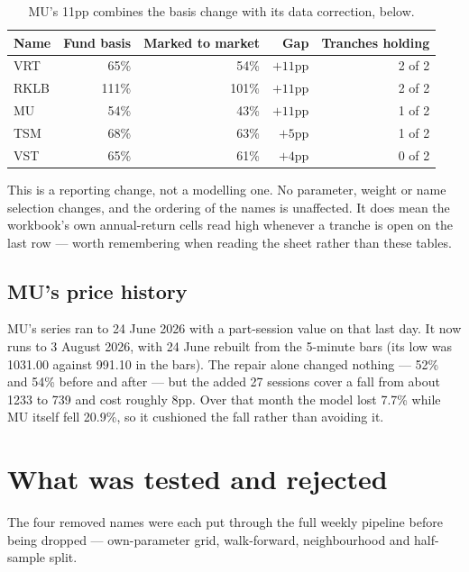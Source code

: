 \documentclass[11pt]{article}
\begin{document}
\begin{table}[H]\centering\small
\begin{tabular}{lrrrr}
\toprule
\textbf{Name} & \textbf{Fund basis} & \textbf{Marked to market} & \textbf{Gap} &
\textbf{Tranches holding}\\
\midrule
\rowcolor{bckeep} VRT  & 65\%  & 54\%  & $+11$pp & 2 of 2\\
RKLB & 111\% & 101\% & $+11$pp & 2 of 2\\
\rowcolor{bckeep} MU   & 54\%  & 43\%  & $+11$pp & 1 of 2\\
TSM  & 68\%  & 63\%  & $+5$pp  & 1 of 2\\
\rowcolor{bckeep} VST  & 65\%  & 61\%  & $+4$pp  & 0 of 2\\
\bottomrule
\end{tabular}
\caption{MU's 11pp combines the basis change with its data correction, below.}
\end{table}

This is a reporting change, not a modelling one. No parameter, weight or name selection changes,
and the ordering of the names is unaffected. It does mean the workbook's own annual-return cells
read high whenever a tranche is open on the last row --- worth remembering when reading the sheet
rather than these tables.

\subsection{MU's price history}

MU's series ran to 24 June 2026 with a part-session value on that last day. It now runs to
3 August 2026, with 24 June rebuilt from the 5-minute bars (its low was 1031.00 against 991.10 in
the bars). The repair alone changed nothing --- 52\% and 54\% before and after --- but the added
27 sessions cover a fall from about 1233 to 739 and cost roughly 8pp. Over that month the model
lost 7.7\% while MU itself fell 20.9\%, so it cushioned the fall rather than avoiding it.

\section{What was tested and rejected}

The four removed names were each put through the full weekly pipeline before being dropped ---
own-parameter grid, walk-forward, neighbourhood and half-sample split.
\end{document}
